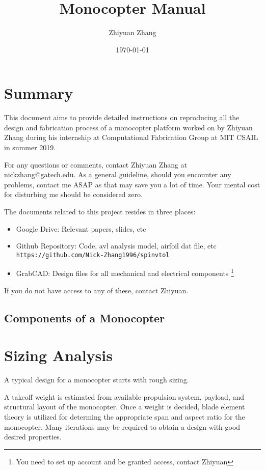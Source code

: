 \documentclass[12pt]{article}
\title{Monocopter Manual}
\author{Zhiyuan Zhang}
\date{\today}
\begin{document}
\maketitle
\section{Summary}
This document aims to provide detailed instructions on reproducing all the design and fabrication process of a monocopter platform worked on by Zhiyuan Zhang during his internship at Computational Fabrication Group at MIT CSAIL in summer 2019.

For any questions or comments, contact Zhiyuan Zhang at nickzhang@gatech.edu. As a general guideline, should you encounter any problems, contact me ASAP as that may save you a lot of time. Your mental cost for disturbing me should be considered zero. 

The documents related to this project resides in three places:
\begin{itemize}
  \item Google Drive: Relevant papers, slides, etc
  \item Github Repository: Code, avl analysis model, airfoil dat file, etc \texttt{https://github.com/Nick-Zhang1996/spinvtol}
  \item GrabCAD: Design files for all mechanical and electrical components \footnote{You need to set up account and be granted access, contact Zhiyuan}
\end{itemize}

If you do not have access to any of these, contact Zhiyuan.

\subsection*{Components of a Monocopter}

\section{Sizing Analysis}
A typical design for a monocopter starts with rough sizing. 

A takeoff weight is estimated from available propulsion system, payload, and structural layout of the monocopter. Once a weight is decided, blade element theory is utilized for determing the appropriate span and aspect ratio for the monocopter. Many iterations may be required to obtain a design with good desired properties.
\end{document}
